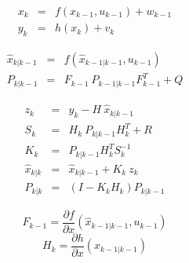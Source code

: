 \begin{eqnarray*}
x_{k} &=& f (x_{k-1}, u_{k-1}) + w_{k-1} \\
y_{k} &=& h (x_{k}) + v_{k}
\end{eqnarray*}

\begin{eqnarray*}
\hat{x}_{k|k-1} &=& f (\hat{x}_{k-1|k-1}, u_{k-1})\\
P_{k|k-1} &=& F_{k-1}\ P_{k-1|k-1} F_{k-1}^T + Q
\end{eqnarray*}

\begin{eqnarray*}
z_{k} &=& y_{k} - H\ \hat{x}_{k|k-1} \\
S_{k} &=& H_{k}\ P_{k|k-1} H_{k}^T + R \\
K_{k} &=& P_{k|k-1} H_{k}^T S_{k}^{-1} \\
\hat{x}_{k|k} &=& \hat{x}_{k|k-1}  + K_{k}\ z_{k} \\
P_{k|k} &=& (I - K_{k} H_{k}) P_{k|k-1}
\end{eqnarray*}

$$
F_{k-1} = \frac{\partial f}{\partial x} (\hat{x}_{k-1|k-1}, u_{k-1})
$$
$$
H_{k} = \frac{\partial h}{\partial x} (\hat{x}_{k-1|k-1})
$$

